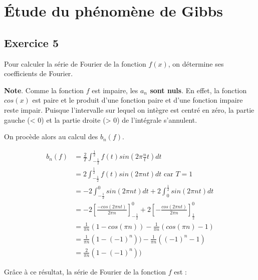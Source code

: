 \documentclass[a4paper,11pt]{article}
\theoremstyle{nonumberplain}
\theoremstyle{nonumberplain}
\begin{document}
\section{\'{E}tude du phénomène de Gibbs}

\subsection*{Exercice 5}

    Pour calculer la série de Fourier de la fonction $f(x)$, on détermine ses coefficients de Fourier.

    \begin{mdframed}[backgroundcolor=gray!10]
        \textbf{Note}. Comme la fonction $f$ est impaire, les \textbf{$a_{n}$ sont nuls}.
        En effet, la fonction $cos(x)$ est paire et le produit d'une fonction paire et d'une fonction impaire reste impair. Puisque
        l'intervalle sur lequel on intègre est centré en zéro, la partie gauche (< 0) et la
        partie droite (> 0) de l'intégrale s'annulent.
    \end{mdframed}

    On procède alors au calcul des $b_{n}(f)$.

    \begin{equation*}
        \begin{split}
            b_{n}(f)    & = \frac{2}{T}\int_{-\frac{1}{2}}^{\frac{1}{2}} f(t)sin(2 \pi \frac{n}{t} t) dt \\
                        & = 2\int_{-\frac{1}{2}}^{\frac{1}{2}} f(t)sin(2 \pi n t) dt \text{ car } T = 1 \\
                        & = -2\int_{-\frac{1}{2}}^{0} sin(2 \pi n t) dt + 2\int_{0}^{\frac{1}{2}} sin(2 \pi n t) dt \\
                        & = -2\left[\frac{-cos(2 \pi n t)}{2 \pi n}\right]_{-\frac{1}{2}}^{0} + 2\left[-\frac{cos(2 \pi n t)}{2 \pi n}\right]_{\frac{1}{2}}^{0} \\
                        & = \frac{1}{\pi n}(1 - cos(\pi n)) - \frac{1}{\pi n}(cos(\pi n) - 1) \\
                        & = \frac{1}{\pi n}(1 - (-1)^n)) - \frac{1}{\pi n}((-1)^n - 1) \\
                        & = \frac{2}{\pi n}(1 - (-1)^n))
        \end{split}
    \end{equation*}

    Grâce à ce résultat, la série de Fourier de la fonction $f$ est :
\end{document}
